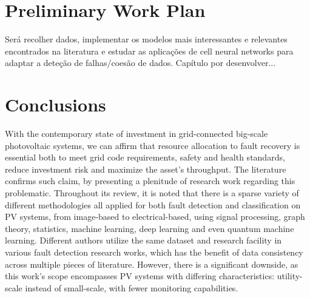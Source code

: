 \chapter{Preliminary Work Plan} \label{chap:chap3}

Será recolher dados, implementar os modelos mais interessantes e relevantes encontrados na literatura e estudar as aplicações de cell neural networks para adaptar a deteção de falhas/coesão de dados. Capítulo por desenvolver...


\chapter{Conclusions}


With the contemporary state of investment in grid-connected big-scale photovoltaic systems, we can affirm that resource allocation to fault recovery is essential both to meet grid code requirements, safety and health standards, reduce investment risk and maximize the asset's throughput. The literature confirms such claim, by presenting a plenitude of research work regarding this problematic. Throughout its review, it is noted that there is a sparse variety of different methodologies all applied for both fault detection and classification on PV systems, from image-based to electrical-based, using signal processing, graph theory, statistics, machine learning, deep learning and even quantum machine learning. Different authors utilize the same dataset and research facility in various fault detection research works, which has the benefit of data consistency across multiple pieces of literature. However, there is a significant downside, as this work's scope encompasses PV systems with differing characteristics: utility-scale instead of small-scale, with fewer monitoring capabilities.